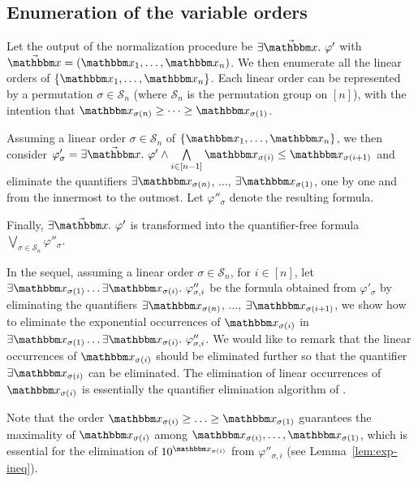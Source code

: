\vspace{-2mm}
\subsection{Enumeration of the variable orders} 

Let the output of the normalization procedure be $\exists \vec{\ivarx}.\ \varphi'$ with $\vec{\ivarx} = (\ivarx_1,\ldots, \ivarx_n)$. 
We then enumerate all the linear orders of $\{\ivarx_1,\ldots, \ivarx_n\}$. Each linear order can be represented by a permutation $\sigma \in \mathcal{S}_n$ (where $\mathcal{S}_n$ is the permutation group on $[n]$), with the intention that $\ivarx_{\sigma(n)} \ge \cdots \ge \ivarx_{\sigma(1)}$.

Assuming a linear order $\sigma \in \mathcal{S}_n$ of $\{\ivarx_1,\ldots, \ivarx_n\}$, we then consider $\varphi'_\sigma  = \exists \vec{\ivarx}.\ \varphi' \wedge \bigwedge \limits_{i \in [n-1]} \ivarx_{\sigma(i)} \le \ivarx_{\sigma(i+1)}$ and eliminate the quantifiers $\exists \ivarx_{\sigma(n)}$, $\ldots$, $\exists \ivarx_{\sigma(1)}$,  one by one and from the innermost to the outmost. Let $\varphi''_\sigma$ denote the resulting formula.

Finally, $\exists \vec{\ivarx}.\ \varphi'$ is transformed into the quantifier-free formula $\bigvee \limits_{\sigma \in \mathcal{S}_n} \varphi''_{\sigma}$. 

In the sequel, assuming a linear order $\sigma \in \mathcal{S}_n$, for $i \in [n]$, let $\exists \ivarx_{\sigma(1)} \ldots \exists \ivarx_{\sigma(i)}.\ \varphi''_{\sigma,i}$ be the formula obtained from $\varphi'_\sigma$ by eliminating the quantifiers $\exists \ivarx_{\sigma(n)}$, $\ldots$, $\exists \ivarx_{\sigma(i+1)}$, we show how to eliminate the exponential occurrences of $\ivarx_{\sigma(i)}$ in $\exists \ivarx_{\sigma(1)} \ldots \exists \ivarx_{\sigma(i)}.\ \varphi''_{\sigma,i}$. We would like to remark that the linear occurrences of $\ivarx_{\sigma(i)}$ should be eliminated further so that the quantifier $\exists \ivarx_{\sigma(i)}$ can be eliminated. The elimination of linear occurrences of $\ivarx_{\sigma(i)}$ is essentially the quantifier elimination algorithm of {\pa}.

Note that the order $\ivarx_{\sigma(i)} \ge \ldots \ge \ivarx_{\sigma(1)}$ guarantees the maximality of $\ivarx_{\sigma(i)}$ among $\ivarx_{\sigma(i)}, \ldots, \ivarx_{\sigma(1)}$, which is essential for the elimination of $10^{\ivarx_{\sigma(i)}}$ from $\varphi''_{\sigma,i}$ (see Lemma~\ref{lem:exp-ineq}).

